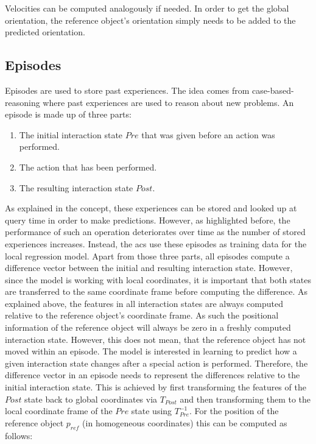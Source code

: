 Velocities can be computed analogously if needed.
In order to get the global orientation, the reference object's orientation simply needs to be added to the predicted orientation. 

\subsection{Episodes \label{sec:episodes}}

Episodes are used to store past experiences. The idea comes from case-based-reasoning \cite{cbr} where past experiences are used to reason about new problems. An episode is made up of three parts: 
\begin{enumerate}
\item The initial interaction state $Pre$ that was given before an action was performed.
\item The action that has been performed.
\item The resulting interaction state $Post$.
\end{enumerate}

As explained in the concept, these experiences can be stored and looked up at query time in order to make predictions. However, as highlighted before, the performance of such an operation deteriorates over time as the number of stored experiences increases. Instead, the \glspl{ac} use these episodes as training data for the local regression model. Apart from those three parts, all episodes compute a difference vector between the initial and resulting interaction state. 
However, since the model is working with local coordinates, it is important that both states are transferred to the same coordinate frame before computing the difference. As explained above, the features in all interaction states are always computed relative to the reference object's coordinate frame. As such the positional information of the reference object will always be zero in a freshly computed interaction state. However, this does not mean, that the reference object has not moved within an episode. The model is interested in learning to predict how a given interaction state changes after a special action is performed. Therefore, the difference vector in an episode needs to represent the differences relative to the initial interaction state. This is achieved by first transforming the features of the $Post$ state back to global coordinates via $T_{Post}$ and then transforming them to the local coordinate frame of the $Pre$ state using $T^{-1}_{Pre}$. For the position of the reference object $p_{ref}$ (in homogeneous coordinates) this can be computed as follows:

